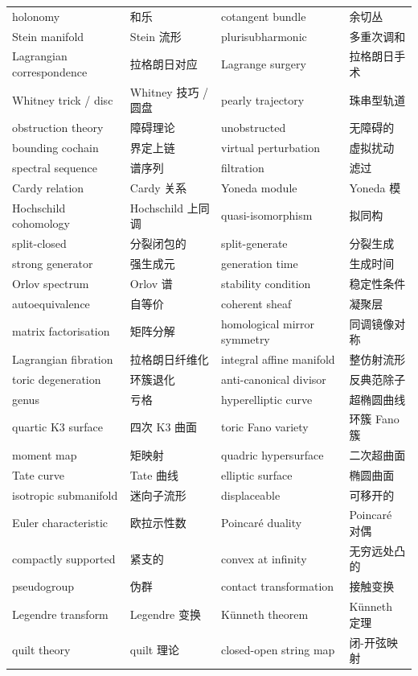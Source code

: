 \begin{center}
\begin{longtable}{p{}p{}p{}p{}}
holonomy & 和乐 & cotangent bundle & 余切丛 \\
Stein manifold & Stein 流形 & plurisubharmonic & 多重次调和 \\
Lagrangian correspondence & 拉格朗日对应 & Lagrange surgery & 拉格朗日手术 \\
Whitney trick / disc & Whitney 技巧 / 圆盘 & pearly trajectory & 珠串型轨道 \\
obstruction theory & 障碍理论 & unobstructed & 无障碍的 \\
bounding cochain & 界定上链 & virtual perturbation & 虚拟扰动 \\
spectral sequence & 谱序列 & filtration & 滤过 \\
Cardy relation & Cardy 关系 & Yoneda module & Yoneda 模 \\
Hochschild cohomology & Hochschild 上同调 & quasi-isomorphism & 拟同构 \\
split-closed & 分裂闭包的 & split-generate & 分裂生成 \\
strong generator & 强生成元 & generation time & 生成时间 \\
Orlov spectrum & Orlov 谱 & stability condition & 稳定性条件 \\
autoequivalence & 自等价 & coherent sheaf & 凝聚层 \\
matrix factorisation & 矩阵分解 & homological mirror symmetry & 同调镜像对称 \\
Lagrangian fibration & 拉格朗日纤维化 & integral affine manifold & 整仿射流形 \\
toric degeneration & 环簇退化 & anti-canonical divisor & 反典范除子 \\
genus & 亏格 & hyperelliptic curve & 超椭圆曲线 \\
quartic K3 surface & 四次 K3 曲面 & toric Fano variety & 环簇 Fano 簇 \\
moment map & 矩映射 & quadric hypersurface & 二次超曲面 \\
Tate curve & Tate 曲线 & elliptic surface & 椭圆曲面 \\
isotropic submanifold & 迷向子流形 & displaceable & 可移开的 \\
Euler characteristic & 欧拉示性数 & Poincar\'e duality & Poincar\'e 对偶 \\
compactly supported & 紧支的 & convex at infinity & 无穷远处凸的 \\
pseudogroup & 伪群 & contact transformation & 接触变换 \\
Legendre transform & Legendre 变换 & K\"unneth theorem & K\"unneth 定理 \\
quilt theory & quilt 理论 & closed-open string map & 闭-开弦映射 \\
\end{longtable}
\end{center}

\clearpage

